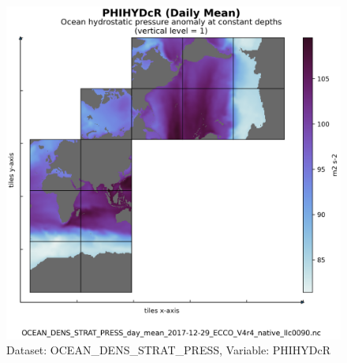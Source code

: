 \begin{longtable}{|m{}|m{}|m{}|m{}|}
\end{longtable}

\begin{figure}[H]
\centering
\includegraphics[scale=0.55]{../images/plots/native_plots/Ocean_Density_Stratification_and_Hydrostatic_Pressure/PHIHYDcR.png}
\caption{Dataset: OCEAN\_DENS\_STRAT\_PRESS, Variable: PHIHYDcR}
\label{tab:table-OCEAN_DENS_STRAT_PRESS_PHIHYDcR-Plot}
\end{figure}
\newpage
\pagebreak
